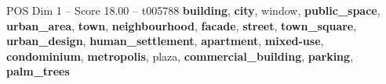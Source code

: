 \begin{textsample}{POS Dim 1 – Score 18.00 – t005788}  \label{ex:f1_pos_031}
\textbf{building}, \textbf{city}, window, \textbf{public\_space}, \textbf{urban\_area}, \textbf{town}, \textbf{neighbourhood}, \textbf{facade}, \textbf{street}, \textbf{town\_square}, \textbf{urban\_design}, \textbf{human\_settlement}, \textbf{apartment}, \textbf{mixed-use}, \textbf{condominium}, \textbf{metropolis}, plaza, \textbf{commercial\_building}, \textbf{parking}, \textbf{palm\_trees}

\end{textsample}
